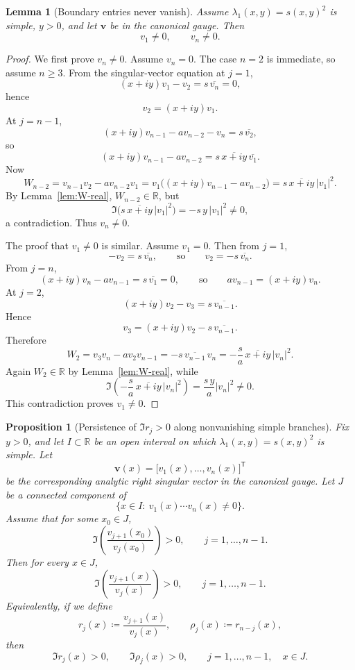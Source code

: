 \documentclass[11pt]{article}
\newtheorem{lemma}[theorem]{Lemma}
\newtheorem{proposition}[theorem]{Proposition}
\begin{document}
\begin{lemma}[Boundary entries never vanish]\label{lem:boundary-entries-nonzero}
Assume \(\lambda_1(x,y)=s(x,y)^2\) is simple, \(y>0\), and let \(\mathbf v\) be in the canonical gauge. Then
\[
v_1\neq 0,
\qquad
v_n\neq 0.
\]
\end{lemma}

\begin{proof}
We first prove \(v_n\neq 0\). Assume \(v_n=0\). The case \(n=2\) is immediate, so assume \(n\ge 3\).
From the singular-vector equation at \(j=1\),
\[
(x+iy)v_1-v_2=s\,\overline{v_n}=0,
\]
hence
\[
v_2=(x+iy)v_1.
\]
At \(j=n-1\),
\[
(x+iy)v_{n-1}-a v_{n-2}-v_n=s\,\overline{v_2},
\]
so
\[
(x+iy)v_{n-1}-a v_{n-2}=s\,\overline{x+iy}\,\overline{v_1}.
\]
Now
\[
W_{n-2}=v_{n-1}v_2-a v_{n-2}v_1
=
v_1\bigl((x+iy)v_{n-1}-a v_{n-2}\bigr)
=
s\,\overline{x+iy}\,|v_1|^2.
\]
By Lemma~\ref{lem:W-real}, \(W_{n-2}\in\mathbb R\), but
\[
\Im\!\bigl(s\,\overline{x+iy}\,|v_1|^2\bigr)=-s\,y\,|v_1|^2\neq 0,
\]
a contradiction. Thus \(v_n\neq 0\).

The proof that \(v_1\neq 0\) is similar. Assume \(v_1=0\). Then from \(j=1\),
\[
-v_2=s\,\overline{v_n},
\qquad\text{so}\qquad
v_2=-s\,\overline{v_n}.
\]
From \(j=n\),
\[
(x+iy)v_n-a v_{n-1}=s\,\overline{v_1}=0,
\qquad\text{so}\qquad
a v_{n-1}=(x+iy)v_n.
\]
At \(j=2\),
\[
(x+iy)v_2-v_3=s\,\overline{v_{n-1}}.
\]
Hence
\[
v_3=(x+iy)v_2-s\,\overline{v_{n-1}}.
\]
Therefore
\[
W_2=v_3v_n-a v_2v_{n-1}
=
-s\,\overline{v_{n-1}}\,v_n
=
-\frac{s}{a}\,\overline{x+iy}\,|v_n|^2.
\]
Again \(W_2\in\mathbb R\) by Lemma~\ref{lem:W-real}, while
\[
\Im\!\left(-\frac{s}{a}\,\overline{x+iy}\,|v_n|^2\right)
=
\frac{s\,y}{a}|v_n|^2\neq 0.
\]
This contradiction proves \(v_1\neq 0\).
\end{proof}

\begin{proposition}[Persistence of \(\Im r_j>0\) along nonvanishing simple branches]\label{prop:r-positivity-branch}
Fix \(y>0\), and let \(I\subset\mathbb R\) be an open interval on which \(\lambda_1(x,y)=s(x,y)^2\) is simple. Let
\[
\mathbf v(x)=\bigl[v_1(x),\dots,v_n(x)\bigr]^{\mathsf T}
\]
be the corresponding analytic right singular vector in the canonical gauge. Let \(J\) be a connected component of
\[
\{x\in I:\ v_1(x)\cdots v_n(x)\neq 0\}.
\]
Assume that for some \(x_0\in J\),
\[
\Im\!\left(\frac{v_{j+1}(x_0)}{v_j(x_0)}\right)>0,
\qquad
j=1,\dots,n-1.
\]
Then for every \(x\in J\),
\[
\Im\!\left(\frac{v_{j+1}(x)}{v_j(x)}\right)>0,
\qquad
j=1,\dots,n-1.
\]
Equivalently, if we define
\[
r_j(x)\coloneqq \frac{v_{j+1}(x)}{v_j(x)},
\qquad
\rho_j(x)\coloneqq r_{n-j}(x),
\]
then
\[
\Im r_j(x)>0,
\qquad
\Im \rho_j(x)>0,
\qquad
j=1,\dots,n-1,
\quad x\in J.
\]
\end{proposition}
\end{document}
